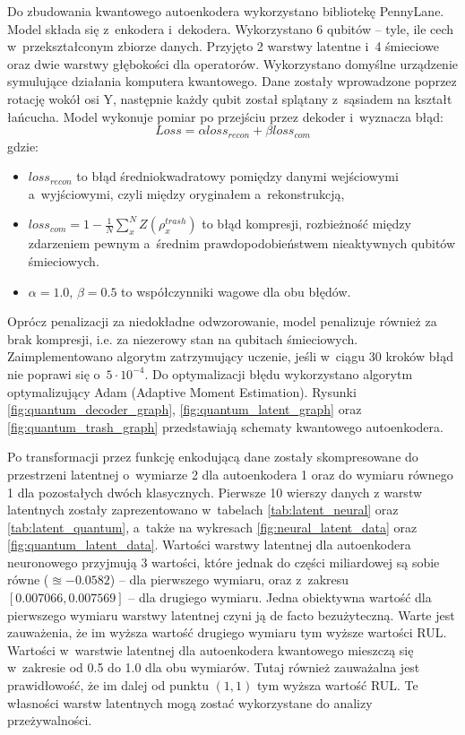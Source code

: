 Do zbudowania kwantowego autoenkodera wykorzystano bibliotekę PennyLane. Model składa się z~enkodera i~dekodera. Wykorzystano 6 qubitów – tyle, ile cech w~przekształconym zbiorze danych. Przyjęto 2 warstwy latentne i~4 śmieciowe oraz dwie warstwy głębokości dla operatorów. Wykorzystano domyślne urządzenie symulujące działania komputera kwantowego. Dane zostały wprowadzone poprzez rotację wokół osi Y, następnie każdy qubit został splątany z~sąsiadem na kształt łańcucha. Model wykonuje pomiar po przejściu przez dekoder i~wyznacza błąd:
\[ Loss = \alpha loss_{recon} + \beta loss_{com}\]
gdzie:
\begin{itemize}
    \item $loss_{recon}$ to błąd średniokwadratowy pomiędzy danymi wejściowymi a~wyjściowymi, czyli między oryginałem a~rekonstrukcją,
    \item $loss_{com} = 1 - \frac{1}{N}\sum_{x}^{N}Z\left(\rho_{x}^{trash}\right)$ to błąd kompresji, rozbieżność między zdarzeniem pewnym a~średnim prawdopodobieństwem nieaktywnych qubitów śmieciowych.
    \item $\alpha = 1.0$, $\beta = 0.5$ to współczynniki wagowe dla obu błędów.
\end{itemize}

Oprócz penalizacji za niedokładne odwzorowanie, model penalizuje również za brak kompresji, i.e. za niezerowy stan na qubitach śmieciowych. Zaimplementowano algorytm zatrzymujący uczenie, jeśli w~ciągu 30 kroków błąd nie poprawi się o~$5\cdot10^{-4}$. Do optymalizacji błędu wykorzystano algorytm optymalizujący Adam (Adaptive Moment Estimation). Rysunki \ref{fig:quantum_decoder_graph}, \ref{fig:quantum_latent_graph} oraz \ref{fig:quantum_trash_graph} przedstawiają schematy kwantowego autoenkodera.

Po transformacji przez funkcję enkodującą dane zostały skompresowane do przestrzeni latentnej o~wymiarze 2 dla autoenkodera 1 oraz do wymiaru równego 1 dla pozostałych dwóch klasycznych. Pierwsze 10 wierszy danych z warstw latentnych zostały zaprezentowano w~tabelach \ref{tab:latent_neural} oraz \ref{tab:latent_quantum}, a~także na wykresach \ref{fig:neural_latent_data} oraz \ref{fig:quantum_latent_data}. Wartości warstwy latentnej dla autoenkodera neuronowego przyjmują 3 wartości, które jednak do części miliardowej są sobie równe ($\approxeq -0.0582$) -- dla pierwszego wymiaru, oraz z~zakresu $[0.007066, 0.007569]$ -- dla drugiego wymiaru. Jedna obiektywna wartość dla pierwszego wymiaru warstwy latentnej czyni ją de facto bezużyteczną. Warte jest zauważenia, że im wyższa wartość drugiego wymiaru tym wyższe wartości RUL. Wartości w~warstwie latentnej dla autoenkodera kwantowego mieszczą się w~zakresie od 0.5 do 1.0 dla obu wymiarów. Tutaj również zauważalna jest prawidłowość, że im dalej od punktu $(1,1)$ tym wyższa wartość RUL. Te własności warstw latentnych mogą zostać wykorzystane do analizy przeżywalności.

